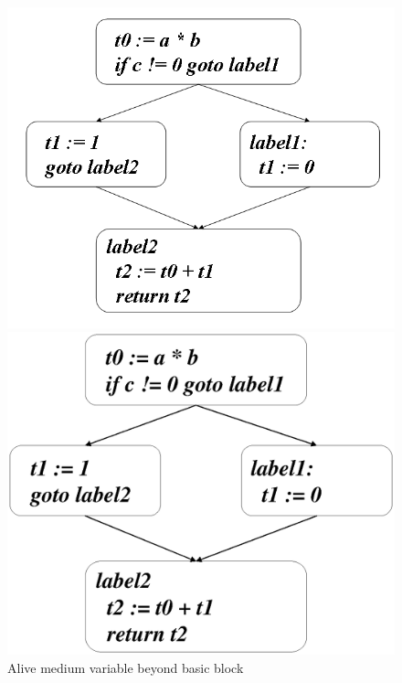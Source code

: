 \begin{figure}[htbp]
\begin{center}
\begin{htmlonly}
\includegraphics[width=0.89\linewidth,height=1.0\linewidth]{beyond_medium.png}
\end{htmlonly}
\begin{latexonly}
\includegraphics[width=0.89\linewidth,height=1.0\linewidth]{beyond_medium.eps}
\end{latexonly}
\caption{Alive medium variable beyond basic block}
\label{optimize_e001}
\end{center}
\end{figure}
